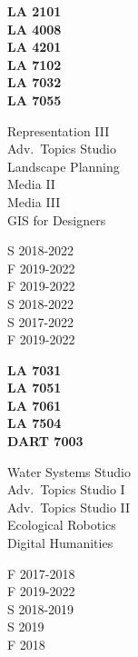 \documentclass[10pt]{developercv} %
\begin{document}
\begin{minipage}[t]{0.1\textwidth} 
\textbf{LA 2101}\\
\textbf{LA 4008}\\
\textbf{LA 4201}\\
\textbf{LA 7102}\\
\textbf{LA 7032}\\
\textbf{LA 7055}\\
\end{minipage}
\begin{minipage}[t]{0.2\textwidth} 
Representation III\\
Adv.~Topics Studio\\
Landscape Planning \\
Media II \\
Media III\\
GIS for Designers\\
\end{minipage}
\begin{minipage}[t]{0.2\textwidth} 
S 2018-2022\\
F 2019-2022\\
F 2019-2022\\
S 2018-2022\\
S 2017-2022\\
F 2019-2022\\
\end{minipage}
\begin{minipage}[t]{0.15\textwidth} 
\textbf{LA 7031}\\
\textbf{LA 7051}\\
\textbf{LA 7061}\\
\textbf{LA 7504}\\
\textbf{DART 7003}\\
\end{minipage}
\begin{minipage}[t]{0.2\textwidth} 
Water Systems Studio\\
Adv.~Topics Studio I\\
Adv.~Topics Studio II\\
Ecological Robotics\\
Digital Humanities\\
\end{minipage}
\begin{minipage}[t]{0.15\textwidth} 
F 2017-2018\\
F 2019-2022\\
S 2018-2019\\
S 2019\\
F 2018\\
\end{minipage}



\end{document}
